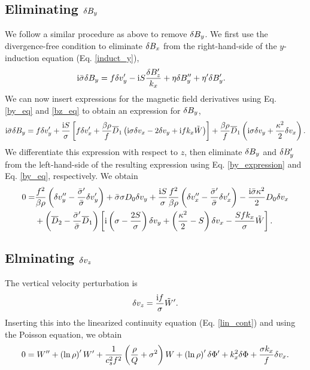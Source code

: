 \subsection{Eliminating $\delta B_y$}
We follow a similar procedure as above to remove $\delta B_y$. We first use
the divergence-free condition to eliminate $\delta B_x$ from the
right-hand-side of the $y$-induction equation (Eq. \ref{induct_y}),
\begin{align}
  &\mathrm{i}\bar{\sigma}\delta B_y = f\delta v_y^\prime - \mathrm{i}
  S\frac{\delta B_z^\prime}{k_x} +
  \eta\delta B_y^{\prime\prime}+\eta^\prime\delta B_y^\prime.  
\end{align}
We can now insert expressions for the magnetic field derivatives using
Eq. \ref{by_eq} and \ref{bz_eq} to obtain an expression for $\delta B_y$, 
\begin{align}
  \mathrm{i}\bar{\sigma}\delta B_y = f \delta v_y^\prime + \frac{\mathrm{i} S}{\sigma}\left[
    f\delta v_x^\prime + \frac{\beta\rho}{f}\overline{D}_1\left(\mathrm{i}\sigma\delta v_x -
  2\delta v_y + \mathrm{i} f k_x\tilde{W} \right)\right] +
  \frac{\beta\rho}{f}\overline{D}_1\left(\mathrm{i}\sigma\delta v_y +
  \frac{\kappa^2}{2}\delta v_x\right). \label{by_expression}
\end{align}
We differentiate this expression with respect to $z$, then eliminate 
$\delta B_y$ and  $\delta B_y^\prime$ from the left-hand-side of the resulting
expression using Eq. \ref{by_expression} and 
Eq. \ref{by_eq}, respectively. We obtain
\begin{align}
  0 =& \frac{f^2}{\beta\rho}\left(\delta v_y^{\prime\prime} -
  \frac{\bar{\sigma}^\prime}{\bar{\sigma}}\delta v_y^\prime\right) 
  + \bar{\sigma}\sigma D_0\delta v_y  + \frac{\mathrm{i} 
    S}{\sigma}\frac{f^2}{\beta\rho}\left(\delta v_x^{\prime\prime} -
    \frac{\bar{\sigma}^\prime}{\bar{\sigma}}\delta v_x^\prime\right) -
    \frac{\mathrm{i}\bar{\sigma}\kappa^2}{2}D_0\delta v_x \notag\\
    & + \left(\overline{D}_2 -
    \frac{\bar{\sigma}^\prime}{\bar{\sigma}}\overline{D}_1\right)\left[\mathrm{i}\left(\sigma
      - \frac{2S}{\sigma}\right)\delta v_y + \left(\frac{\kappa^2}{2} -
      S\right)\delta v_x - \frac{Sfk_x}{\sigma}\tilde{W}\right]. \label{final_vy}
\end{align}

\subsection{Elminating $\delta v_z$}
The vertical velocity perturbation is
\begin{align}
  \delta v_z = \frac{\mathrm{i} f}{\sigma}\tilde{W}^\prime. 
\end{align}
Inserting this into the linearized continuity equation
(Eq. \ref{lin_cont}) and using the Poisson equation, we obtain
\begin{align}
0=  W^{\prime\prime} + \left(\ln{\rho}\right)^\prime W^\prime +
  \frac{1}{c_s^2f^2}\left(\frac{\rho}{Q} + \sigma^2\right)W +
  \left(\ln{\rho}\right)^\prime\delta \Phi^\prime + k_x^2\delta \Phi + \frac{\sigma
  k_x}{f}\delta v_x.\label{final_w}
\end{align}

